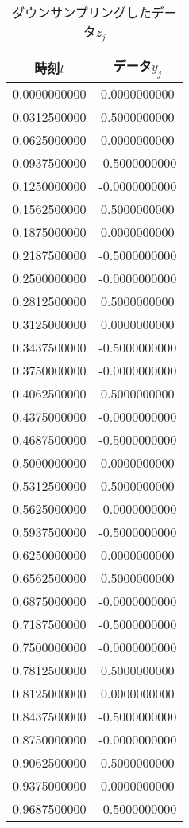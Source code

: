 \begin{table}[h]
\caption{ダウンサンプリングしたデータ$z_j$}
\label{tab:zj}
\centering
\begin{tabular}{cc}
\hline
時刻$t$&データ$y_j$\\
\hline \hline
0.0000000000 & 0.0000000000 \\
0.0312500000 & 0.5000000000 \\
0.0625000000 & 0.0000000000 \\
0.0937500000 & -0.5000000000 \\
0.1250000000 & -0.0000000000 \\
0.1562500000 & 0.5000000000 \\
0.1875000000 & 0.0000000000 \\
0.2187500000 & -0.5000000000 \\
0.2500000000 & -0.0000000000 \\
0.2812500000 & 0.5000000000 \\
0.3125000000 & 0.0000000000 \\
0.3437500000 & -0.5000000000 \\
0.3750000000 & -0.0000000000 \\
0.4062500000 & 0.5000000000 \\
0.4375000000 & -0.0000000000 \\
0.4687500000 & -0.5000000000 \\
0.5000000000 & 0.0000000000 \\
0.5312500000 & 0.5000000000 \\
0.5625000000 & -0.0000000000 \\
0.5937500000 & -0.5000000000 \\
0.6250000000 & 0.0000000000 \\
0.6562500000 & 0.5000000000 \\
0.6875000000 & -0.0000000000 \\
0.7187500000 & -0.5000000000 \\
0.7500000000 & -0.0000000000 \\
0.7812500000 & 0.5000000000 \\
0.8125000000 & 0.0000000000 \\
0.8437500000 & -0.5000000000 \\
0.8750000000 & -0.0000000000 \\
0.9062500000 & 0.5000000000 \\
0.9375000000 & 0.0000000000 \\
0.9687500000 & -0.5000000000 \\
\hline
\end{tabular}
\end{table}